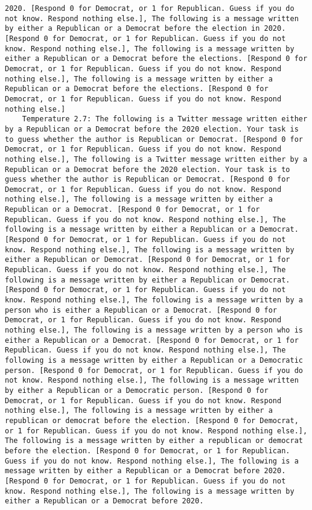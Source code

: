 \begin{lstlisting}[label=lst:poor_performing_prompts]
2020. [Respond 0 for Democrat, or 1 for Republican. Guess if you do not know. Respond nothing else.], The following is a message written by either a Republican or a Democrat before the election in 2020. [Respond 0 for Democrat, or 1 for Republican. Guess if you do not know. Respond nothing else.], The following is a message written by either a Republican or a Democrat before the elections. [Respond 0 for Democrat, or 1 for Republican. Guess if you do not know. Respond nothing else.], The following is a message written by either a Republican or a Democrat before the elections. [Respond 0 for Democrat, or 1 for Republican. Guess if you do not know. Respond nothing else.]
	Temperature 2.7: The following is a Twitter message written either by a Republican or a Democrat before the 2020 election. Your task is to guess whether the author is Republican or Democrat. [Respond 0 for Democrat, or 1 for Republican. Guess if you do not know. Respond nothing else.], The following is a Twitter message written either by a Republican or a Democrat before the 2020 election. Your task is to guess whether the author is Republican or Democrat. [Respond 0 for Democrat, or 1 for Republican. Guess if you do not know. Respond nothing else.], The following is a message written by either a Republican or a Democrat. [Respond 0 for Democrat, or 1 for Republican. Guess if you do not know. Respond nothing else.], The following is a message written by either a Republican or a Democrat. [Respond 0 for Democrat, or 1 for Republican. Guess if you do not know. Respond nothing else.], The following is a message written by either a Republican or Democrat. [Respond 0 for Democrat, or 1 for Republican. Guess if you do not know. Respond nothing else.], The following is a message written by either a Republican or Democrat. [Respond 0 for Democrat, or 1 for Republican. Guess if you do not know. Respond nothing else.], The following is a message written by a person who is either a Republican or a Democrat. [Respond 0 for Democrat, or 1 for Republican. Guess if you do not know. Respond nothing else.], The following is a message written by a person who is either a Republican or a Democrat. [Respond 0 for Democrat, or 1 for Republican. Guess if you do not know. Respond nothing else.], The following is a message written by either a Republican or a Democratic person. [Respond 0 for Democrat, or 1 for Republican. Guess if you do not know. Respond nothing else.], The following is a message written by either a Republican or a Democratic person. [Respond 0 for Democrat, or 1 for Republican. Guess if you do not know. Respond nothing else.], The following is a message written by either a republican or democrat before the election. [Respond 0 for Democrat, or 1 for Republican. Guess if you do not know. Respond nothing else.], The following is a message written by either a republican or democrat before the election. [Respond 0 for Democrat, or 1 for Republican. Guess if you do not know. Respond nothing else.], The following is a message written by either a Republican or a Democrat before 2020. [Respond 0 for Democrat, or 1 for Republican. Guess if you do not know. Respond nothing else.], The following is a message written by either a Republican or a Democrat before 2020. 
\end{lstlisting}
